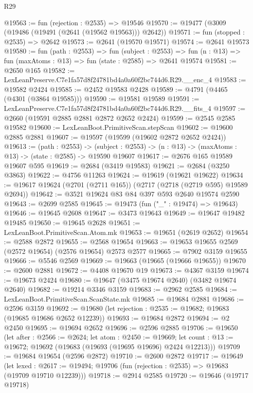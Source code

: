 \begin{lexlean}{R29}
\begin{coremodule}
@19563 := fun (rejection : @2535) => @19546
@19570 := @19477 (@3009 (@19486 (@19491 (@2641 (@19562 @19563))) @2642))
@19571 := fun (stopped : @2535) => @2642
@19573 := @2641 (@19570 @19571)
@19574 := @2641 @19573
@19580 := fun (path : @2553) =>
  fun (subject : @2553) =>
  fun (n : @13) => fun (maxAtoms : @13) => fun (state : @2585) => @2641 @19574
@19581 := @2650 @165
@19582 := LexLeanPreserve.C7e1fa57d8f24781bd4a0a60f2bc744d6.R29.__enc_4
@19583 := @19582 @2424
@19585 := @2452 @19583 @2428
@19589 := @4791 (@4465 (@4301 (@3864 @19585)))
@19590 := @19581 @19589
@19591 := LexLeanPreserve.C7e1fa57d8f24781bd4a0a60f2bc744d6.R29.__fits_4
@19597 := @2660 (@19591 @2885 @2881 @2872 @2652 @2424)
@19599 := @2545 @2585 @19582
@19600 := LexLeanBoot.PrimitiveScan.stepScan
@19602 := @19600 @2885 @2881
@19607 := @19597 (@19599 (@19602 @2872 @2652 @2424))
@19613 := (path : @2553) ->
  (subject : @2553) -> (n : @13) -> (maxAtoms : @13) -> (state : @2585) -> @19590 @19607
@19617 := @2676 @165 @19589 @19607 @595
@19619 := @2684 (@3419 @19583)
@19621 := @2684 (@3250 @3863)
@19622 := @4756 @11263
@19624 := @19619 (@19621 @19622)
@19634 := @19617 @19624 (@2701 (@2711 @165)) (@2717 (@2718 (@2719 @595) @19589 @2694))
@19642 := @3521 @19624 @83 @84 @397 @593 @2640 @19574 @2590
@19643 := @2699 @2585
@19645 := @19473 (fun ("_" : @19474) => @19643)
@19646 := @19645 @2608
@19647 := @3473 @19643
@19649 := @19647 @19482 @19485
@19650 := @19645 @2628
@19651 := LexLeanBoot.PrimitiveScan.Atom.mk
@19653 := @19651 (@2619 @2652)
@19654 := @2588 @2872
@19655 := @2568 @19654
@19663 := @19653 @19655 @2569 (@2572 @19654) (@2576 @19654) @2573 @2577
@19665 := @7902 @3159 @19655
@19666 := @5546 @2569
@19669 := @19663 (@19665 (@19666 @19655))
@19670 := @2600 @2881
@19672 := @4408 @19670 @19
@19673 := @4367 @3159
@19674 := @19673 @2424
@19680 := @19647 (@3475 @19674 @2640) (@3482 @19674 @2640)
@19682 := @19214 @3346 @3159
@19683 := @2962 @2585
@19684 := LexLeanBoot.PrimitiveScan.ScanState.mk
@19685 := @19684 @2881
@19686 := @2596 @3159
@19692 := @19680 (let rejection : @2535 := @19682; @19683 (@19685 @19686 @2652 @12239))
@19693 := @19684 @2872
@19694 := @2 @2450
@19695 := @19694 @2652
@19696 := @2596 @2885
@19706 := @19650
    (let after : @2566 := @2624;
    let atom : @2450 := @19669;
    let count : @13 := @19672; @19692 (@19683 (@19693 (@19695 @19696) @2424 @12213)))
@19709 := @19684 @19654 (@2596 @2872)
@19710 := @2600 @2872
@19717 := @19649
    (let lexed : @2617 := @19494; @19706 (fun (rejection : @2535) => @19683 (@19709 @19710 @12239)))
@19718 := @2914 @2585
@19720 := @19646 (@19717 @19718)

\end{coremodule}
\end{lexlean}
